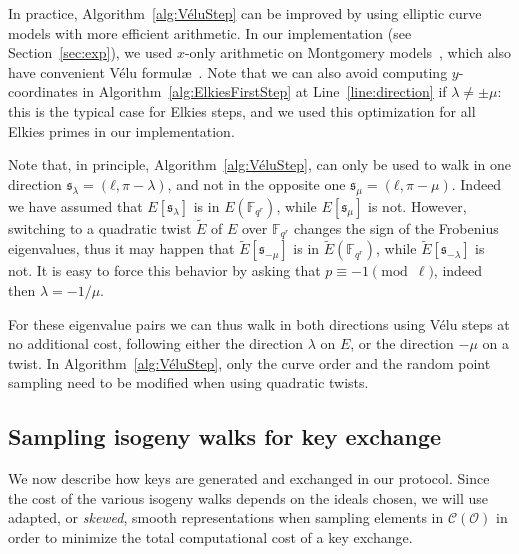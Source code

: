 \documentclass{llncs}
\newcommand{\F}{\mathbb{F}}
\newcommand{\Cl}{\mathcal{C}}
\renewcommand{\O}{\mathcal{O}}
\renewcommand{\frak}{\mathfrak}
\begin{document}
In practice, Algorithm~\ref{alg:VéluStep} can be improved
by using elliptic curve models with more efficient arithmetic.
In our implementation (see Section~\ref{sec:exp}),
we used $x$-only arithmetic on Montgomery models~\cite{Montgomery87,CostelloSmith2017},
which also have convenient Vélu formul\ae~\cite{CostelloH17,Renes2018}.
Note that we can also avoid computing $y$-coordinates in
Algorithm~\ref{alg:ElkiesFirstStep}
at Line~\ref{line:direction} if $\lambda\neq\pm\mu$:
this is the typical case for Elkies steps, and we used this
optimization for all Elkies primes in our implementation.

\begin{remark}
    \label{rem:twist-trick}
    Note that, in principle, Algorithm~\ref{alg:VéluStep}, can only be
    used to walk in one direction $\frak s_λ=(ℓ,π-λ)$, and not in the
    opposite one $\frak s_μ=(ℓ,π-μ)$. Indeed we have assumed that
    $E[\frak s_λ]$ is in $E(\F_{q^r})$, while $E[\frak s_μ]$ is not.
    However, switching to a quadratic twist $\tilde{E}$ of $E$ over
    $\F_{q^r}$ changes the sign of the Frobenius eigenvalues, thus it
    may happen that $\tilde{E}[\frak s_{-μ}]$ is in
    $\tilde{E}(\F_{q^r})$, while $\tilde{E}[\frak s_{-λ}]$ is not.  It
    is easy to force this behavior by asking that
    $p \equiv -1\pmod{\ell}$, indeed then $\lambda = -1/μ$.

    For these eigenvalue pairs we can thus walk in both directions
    using Vélu steps at no additional cost, following either the
    direction $λ$ on $E$, or the direction $-μ$ on a twist. In
    Algorithm~\ref{alg:VéluStep}, only the curve order and the random
    point sampling need to be modified when using quadratic twists.
\end{remark}

\subsection{Sampling isogeny walks for key exchange}

We now describe how keys are generated and exchanged in our protocol. 
Since the cost of the various isogeny walks depends on the ideals
chosen,
we will use adapted, or \emph{skewed}, 
smooth representations when sampling elements in $\Cl(\O)$
in order to minimize the total computational cost of a key exchange.
\end{document}
